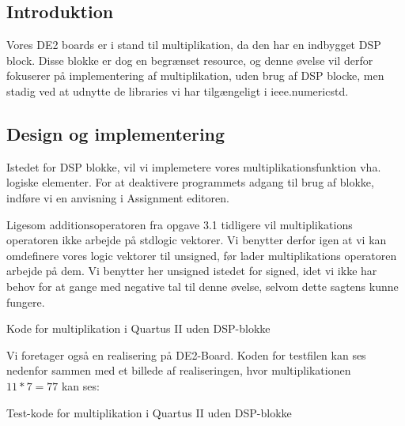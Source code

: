 \documentclass[../journal2.tex]{subfiles}
\begin{document}
\subsection{Introduktion}

Vores DE2 boards er i stand til multiplikation, da den har en indbygget DSP block. Disse blokke er dog en begrænset resource, og denne øvelse vil derfor fokuserer på implementering af multiplikation, uden brug af DSP blocke, men stadig ved at udnytte de libraries vi har tilgængeligt i ieee.numeric\textunderscore std.

\subsection{Design og implementering}

Istedet for DSP blokke, vil vi implemetere vores multiplikationsfunktion vha. logiske elementer. For at deaktivere programmets adgang til brug af blokke, indføre vi en anvisning i Assignment editoren.


Ligesom additionsoperatoren fra opgave 3.1 tidligere vil multiplikations operatoren ikke arbejde på std\textunderscore logic vektorer. Vi benytter derfor igen at vi kan omdefinere vores \textunderscore logic vektorer til unsigned, før lader multiplikations operatoren arbejde på dem. Vi benytter her unsigned istedet for signed, idet vi ikke har behov for at gange med negative tal til denne øvelse, selvom dette sagtens kunne fungere.

\begin{table}[H]
    \centering
      \framebox{
        \rule{8pt}{0pt}
          
}
  \caption{Kode for multiplikation i Quartus II uden DSP-blokke}	
  \label{src:Tab1}
\end{table}

Vi foretager også en realisering på DE2-Board. Koden for testfilen kan ses nedenfor sammen med et billede af realiseringen, hvor multiplikationen $11*7=77$ kan ses:


\begin{table}[H]
    \centering
      \framebox{
        \rule{8pt}{0pt}
          
}
  \caption{Test-kode for multiplikation i Quartus II uden DSP-blokke}	
  \label{src:Tab2}
\end{table}
\end{document}
